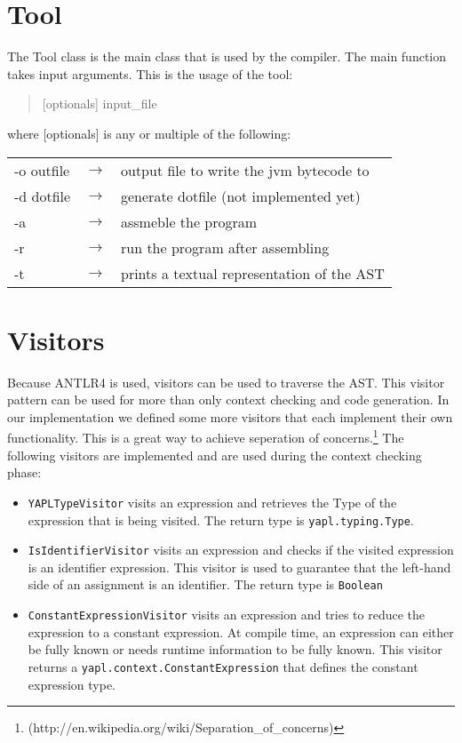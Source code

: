 \section{Tool}
The Tool class is the main class that is used by the compiler. The main function takes input arguments. This is the usage of the tool:
\begin{quote}
[optionals] input_file
\end{quote} 

\noindent
where [optionals] is any or multiple of the following: \\
\begin{tabular}{lcl}
-o outfile 	&$\rightarrow$& output file to write the jvm bytecode to \\
-d dotfile	&$\rightarrow$& generate dotfile (not implemented yet) \\
-a 			&$\rightarrow$& assmeble the program \\
-r	 		&$\rightarrow$& run the program after assembling \\
-t			&$\rightarrow$& prints a textual representation of the AST \\
\end{tabular} 

\section{Visitors}
Because ANTLR4 is used, visitors can be used to traverse the AST. This visitor pattern can be used for more than only context checking and code generation. In our implementation we defined some more visitors that each implement their own functionality. This is a great way to achieve seperation of concerns.\footnote{(http://en.wikipedia.org/wiki/Separation_of_concerns)} The following visitors are implemented and are used during the context checking phase:

\begin{itemize}
\item \texttt{YAPLTypeVisitor} visits an expression and retrieves the Type of the expression that is being visited. The return type is \texttt{yapl.typing.Type}.
\item \texttt{IsIdentifierVisitor} visits an expression and checks if the visited expression is an identifier expression. This visitor is used to guarantee that the left-hand side of an assignment is an identifier. The return type is \texttt{Boolean}
\item \texttt{ConstantExpressionVisitor} visits an expression and tries to reduce the expression to a constant expression. At compile time, an expression can either be fully known or needs runtime information to be fully known. This visitor returns a \texttt{yapl.context.ConstantExpression} that defines the constant expression type.
\end{itemize}

